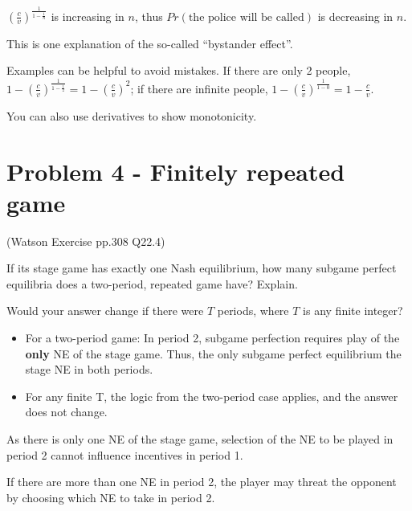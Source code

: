 \documentclass{article}
\begin{document}
$\left( \tfrac{c}{v} \right)^\frac 1{1-\tfrac 1n}$ is increasing in $n$, thus $Pr(\text{the police  will be called})$ is decreasing in $n$.

\begin{mdframed}[backgroundcolor=blue!20,linecolor=white]
This is one explanation of the so-called ``bystander effect''.
\end{mdframed}

\begin{mdframed}[backgroundcolor=yellow!20,linecolor=white]

Examples can be helpful to avoid mistakes. If there are only 2 people, $1-\left( \tfrac{c}{v} \right)^\frac 1{1-\tfrac 1 2} =1- \left( \tfrac{c}{v} \right)^2$; if there are infinite people,  $1- \left( \tfrac{c}{v} \right)^\frac 1{1-0} =1- \tfrac{c}{v}$.

\smallskip
You can also use derivatives to show monotonicity.
\end{mdframed}




\section{Problem 4 - Finitely repeated game}

(Watson Exercise pp.308 Q22.4)

If its stage game has exactly one Nash equilibrium, how many subgame
perfect equilibria does a two-period, repeated game have? Explain. 

\smallskip

Would your answer change if there were $T$ periods, where $T$ is any finite integer?

\bigskip


\begin{itemize}
\item For a two-period game: In period 2, subgame perfection requires play of the \textbf{only} NE
of the stage game. Thus, the only subgame perfect equilibrium the stage NE in both periods. 

\item For any finite T, the logic from the two-period case applies, and the answer does not
change.

\end{itemize}

\begin{mdframed}[backgroundcolor=blue!20,linecolor=white]
As there is only one NE of the stage game,
selection of the NE to be played in period 2 cannot influence
incentives in period 1.

\medskip 

If there are more than one NE in period 2, 
the player may threat the opponent by choosing which NE to take in period 2.

\end{mdframed}
\end{document}
